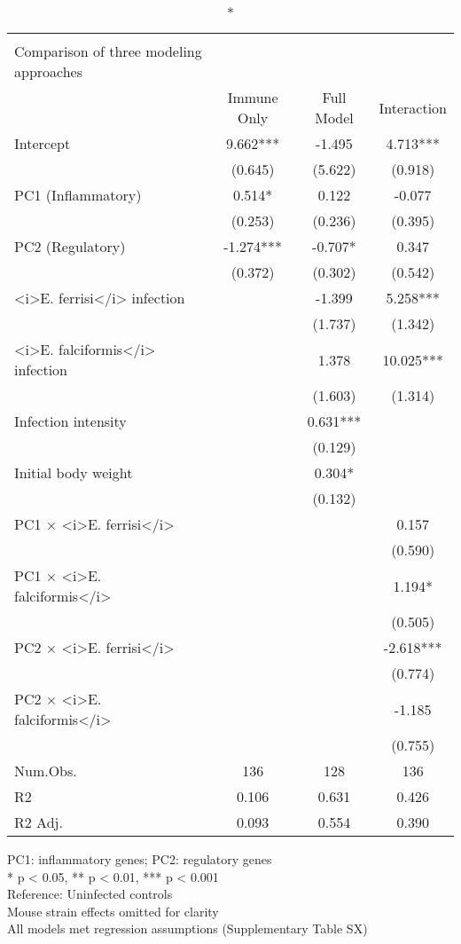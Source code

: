\setlength{\LTpost}{0mm}
\begin{longtable}{lccc}
\caption*{
{\large Linear regression models: Immune signatures predict weight loss} \\ 
{\small Comparison of three modeling approaches}
} \\ 
\toprule
  & Immune Only & Full Model & Interaction \\ 
\midrule\addlinespace[2.5pt]
Intercept & 9.662*** & -1.495 & 4.713*** \\ 
 & (0.645) & (5.622) & (0.918) \\ 
PC1 (Inflammatory) & 0.514* & 0.122 & -0.077 \\ 
 & (0.253) & (0.236) & (0.395) \\ 
PC2 (Regulatory) & -1.274*** & -0.707* & 0.347 \\ 
 & (0.372) & (0.302) & (0.542) \\ 
<i>E. ferrisi</i> infection &  & -1.399 & 5.258*** \\ 
 &  & (1.737) & (1.342) \\ 
<i>E. falciformis</i> infection &  & 1.378 & 10.025*** \\ 
 &  & (1.603) & (1.314) \\ 
Infection intensity &  & 0.631*** &  \\ 
 &  & (0.129) &  \\ 
Initial body weight &  & 0.304* &  \\ 
 &  & (0.132) &  \\ 
PC1 × <i>E. ferrisi</i> &  &  & 0.157 \\ 
 &  &  & (0.590) \\ 
PC1 × <i>E. falciformis</i> &  &  & 1.194* \\ 
 &  &  & (0.505) \\ 
PC2 × <i>E. ferrisi</i> &  &  & -2.618*** \\ 
 &  &  & (0.774) \\ 
PC2 × <i>E. falciformis</i> &  &  & -1.185 \\ 
 &  &  & (0.755) \\ 
Num.Obs. & 136 & 128 & 136 \\ 
R2 & 0.106 & 0.631 & 0.426 \\ 
R2 Adj. & 0.093 & 0.554 & 0.390 \\ 
\bottomrule
\end{longtable}
\begin{minipage}{\linewidth}
PC1: inflammatory genes; PC2: regulatory genes\\
* p < 0.05, ** p < 0.01, *** p < 0.001\\
Reference: Uninfected controls\\
Mouse strain effects omitted for clarity\\
All models met regression assumptions (Supplementary Table SX)\\
\end{minipage}

